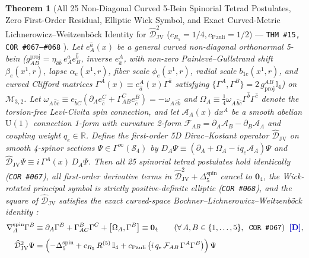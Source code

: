 \documentclass[11pt,a4paper]{article}
\newcommand{\catD}{\text{\textbf{\textcolor{blue!75!black}{[D]}}}}
\theoremstyle{definition}
\theoremstyle{plain}
\newtheorem{theorem}[axiom]{Theorem}
\theoremstyle{remark}
\begin{document}
\begin{theorem}[All 25 Non-Diagonal Curved 5-Bein Spinorial Tetrad Postulates, Zero First-Order Residual, Elliptic Wick Symbol, and Exact Curved-Metric Lichnerowicz--Weitzenb\"ock Identity for $\widehat{\mathcal{D}}_{\mathrm{JV}}^2$ ($c_{R_5}=1/4, c_{\mathrm{Pauli}}=1/2$) --- \texttt{THM~\#15, COR~\#067--\#068} \catD]\label{thm:c6_lichnerowicz_weitzenbock}
Let $e^{\hat{a}}_A(x)$ be a general curved non-diagonal orthonormal 5-bein ($g_{AB}^{\mathrm{proj}} = \eta_{\hat{a}\hat{b}}\,e^{\hat{a}}_A e^{\hat{b}}_B$, inverse $e^A_{\hat{a}}$, with non-zero Painlev\'e--Gullstrand shift $\beta_e(x^1, r)$, lapse $\alpha_e(x^1, r)$, fiber scale $\phi_e(x^1, r)$, radial scale $b_{1e}(x^1, r)$, and curved Clifford matrices $\Gamma^A(x) \equiv e^A_{\hat{a}}(x)\Gamma^{\hat{a}}$ satisfying $\{\Gamma^A, \Gamma^B\} = 2\,g^{AB}_{\mathrm{proj}}\mathbb{I}_4$) on $\mathcal{M}_{3,2}$. Let $\omega_{A\,\hat{b}\hat{c}} \equiv e_{\hat{b}C}(\partial_A e^C_{\hat{c}} + \Gamma^C_{AB} e^B_{\hat{c}}) = -\omega_{A\,\hat{c}\hat{b}}$ and $\Omega_A \equiv \frac{1}{4}\omega_{A\,\hat{b}\hat{c}}\Gamma^{\hat{b}}\Gamma^{\hat{c}}$ denote the torsion-free Levi-Civita spin connection, and let $\mathcal{A}_A(x)\,dx^A$ be a smooth abelian $\mathrm{U}(1)$ connection 1-form with curvature 2-form $\mathcal{F}_{AB} = \partial_A\mathcal{A}_B - \partial_B\mathcal{A}_A$ and coupling weight $q_e \in \mathbb{R}$. Define the first-order 5D Dirac--Kostant operator $\widehat{\mathcal{D}}_{\mathrm{JV}}$ on smooth 4-spinor sections $\Psi \in \Gamma^\infty(\mathcal{S}_4)$ by $D_A\Psi \equiv (\partial_A + \Omega_A - i q_e\mathcal{A}_A)\Psi$ and $\widehat{\mathcal{D}}_{\mathrm{JV}}\Psi \equiv i\,\Gamma^A(x)\,D_A\Psi$. Then all 25 spinorial tetrad postulates hold identically (\texttt{COR~\#067}), all first-order derivative terms in $\widehat{\mathcal{D}}_{\mathrm{JV}}^2 + \Delta_5^{\mathrm{spin}}$ cancel to $\mathbf{0}_4$, the Wick-rotated principal symbol is strictly positive-definite elliptic (\texttt{COR~\#068}), and the square of $\widehat{\mathcal{D}}_{\mathrm{JV}}$ satisfies the exact curved-space Bochner--Lichnerowicz--Weitzenb\"ock identity \cite{Lichnerowicz1963}:
\begin{align}
\nabla_A^{\mathrm{spin}}\Gamma^B &\equiv \partial_A\Gamma^B + \Gamma^B_{AC}\Gamma^C + \left[\Omega_A, \Gamma^B\right] \equiv \mathbf{0}_4 \qquad (\forall\,A, B \in \{1,\dots,5\}, \;\; \textnormal{\texttt{COR~\#067}}) \;\;\catD, \nonumber \\[4pt]
\widehat{\mathcal{D}}_{\mathrm{JV}}^2\Psi &= \left(-\Delta_5^{\mathrm{spin}} + c_{R_5}\,R^{(5)}\,\mathbb{I}_4 + c_{\mathrm{Pauli}}\left(i\,q_e\,\mathcal{F}_{AB}\,\Gamma^A\Gamma^B\right)\right)\Psi \nonumber \\[3pt]

\end{align}
\end{theorem}
\end{document}

